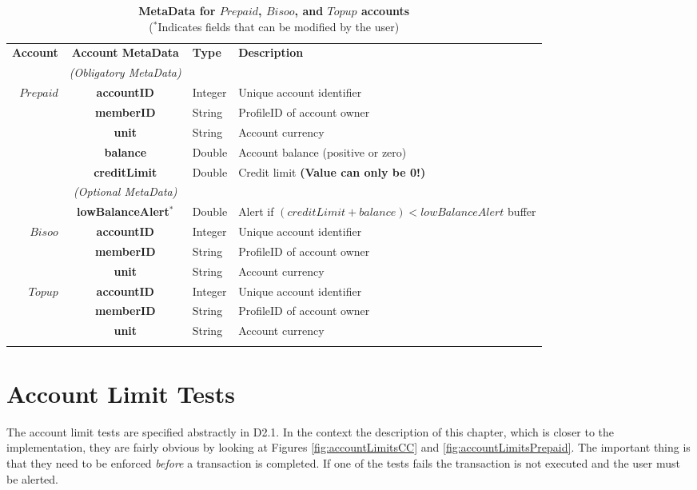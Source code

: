 \begin{table}[H]
\begin{centering}
\small
{
\begin{tabular}{ r | c | l | l }
\hline
\textbf{Account}	& {\bf Account MetaData} & {\bf Type} & {\bf Description} \\
\Xhline{1.5pt}
			 & \emph{(Obligatory MetaData)}& & \\
\cline{2-2}
$Prepaid$ 	& {\bf accountID}			&Integer	& Unique account identifier \\
			& {\bf memberID}			&String	& ProfileID of account owner \\
			& {\bf unit}					&String	& Account currency \\
			& {\bf balance}				&Double	& Account balance (positive or zero) \\
			& {\bf creditLimit}			&Double	& Credit limit {\bf (Value can only be 0!)} \\
\cline{2-2}
			 & \emph{(Optional MetaData)}& & \\
\cline{2-2}
			& {\bf lowBalanceAlert$^*$}		&Double	& Alert if $(creditLimit + balance) < lowBalanceAlert$ buffer \\
\Xhline{1.5pt}
$Bisoo$ 		& {\bf accountID}			&Integer	& Unique account identifier \\
			& {\bf memberID}			&String	& ProfileID of account owner \\
			& {\bf unit}					&String	& Account currency \\
\Xhline{1.5pt}
$Topup$ 		& {\bf accountID}			&Integer	& Unique account identifier \\
			& {\bf memberID}			&String	& ProfileID of account owner \\
			& {\bf unit}					&String	& Account currency \\
\Xhline{1.5pt}
\end{tabular}
}
\caption{\small\textbf{MetaData for $Prepaid$, $Bisoo$, and $Topup$ accounts}\\
($^*$Indicates fields that can be modified by the user)}
\label{tab:AccountMetaData2}
\end{centering}
\end{table}

\section{Account Limit Tests}
The account limit tests are specified abstractly in D2.1. In the context the description of this chapter, which is closer to the implementation, they are fairly obvious by looking at Figures \ref{fig:accountLimitsCC} and \ref{fig:accountLimitsPrepaid}. The important thing is that they need to be enforced \emph{before} a transaction is completed. If one of the tests fails the transaction is not executed and the user must be alerted.

